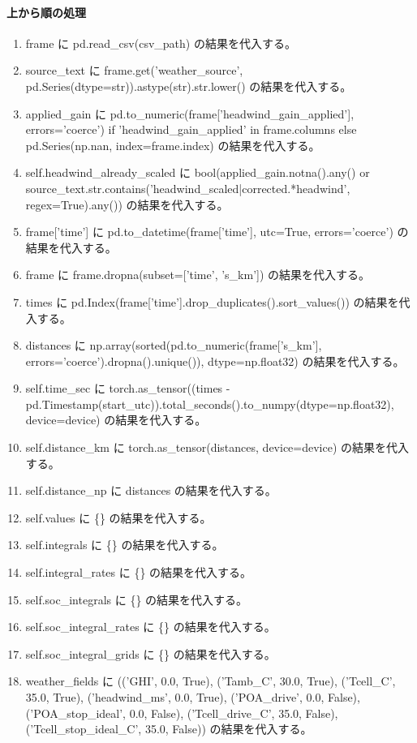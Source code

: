 \documentclass[a4paper,11pt]{article}
\begin{document}
            \paragraph{上から順の処理}
            \begin{enumerate}[leftmargin=1.8em]
            \item frame に pd.read\_csv(csv\_path) の結果を代入する。
\item source\_text に frame.get('weather\_source', pd.Series(dtype=str)).astype(str).str.lower() の結果を代入する。
\item applied\_gain に pd.to\_numeric(frame['headwind\_gain\_applied'], errors='coerce') if 'headwind\_gain\_applied' in frame.columns else pd.Series(np.nan, index=frame.index) の結果を代入する。
\item self.headwind\_already\_scaled に bool(applied\_gain.notna().any() or source\_text.str.contains('headwind\_scaled|corrected.*headwind', regex=True).any()) の結果を代入する。
\item frame['time'] に pd.to\_datetime(frame['time'], utc=True, errors='coerce') の結果を代入する。
\item frame に frame.dropna(subset=['time', 's\_km']) の結果を代入する。
\item times に pd.Index(frame['time'].drop\_duplicates().sort\_values()) の結果を代入する。
\item distances に np.array(sorted(pd.to\_numeric(frame['s\_km'], errors='coerce').dropna().unique()), dtype=np.float32) の結果を代入する。
\item self.time\_sec に torch.as\_tensor((times - pd.Timestamp(start\_utc)).total\_seconds().to\_numpy(dtype=np.float32), device=device) の結果を代入する。
\item self.distance\_km に torch.as\_tensor(distances, device=device) の結果を代入する。
\item self.distance\_np に distances の結果を代入する。
\item self.values に \{\} の結果を代入する。
\item self.integrals に \{\} の結果を代入する。
\item self.integral\_rates に \{\} の結果を代入する。
\item self.soc\_integrals に \{\} の結果を代入する。
\item self.soc\_integral\_rates に \{\} の結果を代入する。
\item self.soc\_integral\_grids に \{\} の結果を代入する。
\item weather\_fields に (('GHI', 0.0, True), ('Tamb\_C', 30.0, True), ('Tcell\_C', 35.0, True), ('headwind\_ms', 0.0, True), ('POA\_drive', 0.0, False), ('POA\_stop\_ideal', 0.0, False), ('Tcell\_drive\_C', 35.0, False), ('Tcell\_stop\_ideal\_C', 35.0, False)) の結果を代入する。

\end{enumerate}
\end{document}
